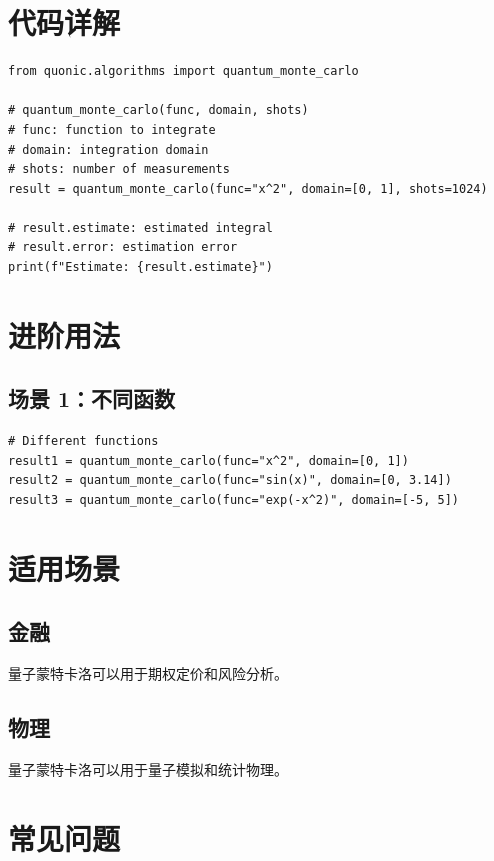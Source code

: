 \documentclass[12pt,a4paper]{article}
\begin{document}
\section{代码详解}

\begin{lstlisting}[style=python]
from quonic.algorithms import quantum_monte_carlo

# quantum_monte_carlo(func, domain, shots)
# func: function to integrate
# domain: integration domain
# shots: number of measurements
result = quantum_monte_carlo(func="x^2", domain=[0, 1], shots=1024)

# result.estimate: estimated integral
# result.error: estimation error
print(f"Estimate: {result.estimate}")
\end{lstlisting}

\section{进阶用法}

\subsection{场景 1：不同函数}

\begin{lstlisting}[style=python]
# Different functions
result1 = quantum_monte_carlo(func="x^2", domain=[0, 1])
result2 = quantum_monte_carlo(func="sin(x)", domain=[0, 3.14])
result3 = quantum_monte_carlo(func="exp(-x^2)", domain=[-5, 5])
\end{lstlisting}

\section{适用场景}

\subsection{金融}

量子蒙特卡洛可以用于期权定价和风险分析。

\subsection{物理}

量子蒙特卡洛可以用于量子模拟和统计物理。

\section{常见问题}
\end{document}
